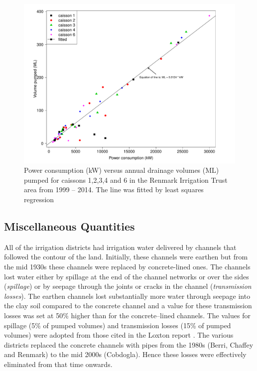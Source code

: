 \documentclass[a4paper, titlepage, 12pt]{article}\usepackage[]{graphicx}\usepackage[]{color}
\newenvironment{knitrout}{}{} %
\begin{document}
\begin{sffamily}
\begin{figure}
\begin{knitrout}
\color{fgcolor}
\includegraphics[width=0.95\linewidth]{../figures/cds-1} 

\end{knitrout}
\caption{Power consumption (kW) versus annual drainage volumes (ML) pumped for caissons 1,2,3,4 and 6 in the Renmark Irrigation Trust area from 1999 -- 2014. The line was fitted by least squares regression}
\label{fig02}
\end{figure}

\subsection{Miscellaneous Quantities}
All of the irrigation districts had irrigation water delivered by channels that followed the contour of the land. Initially, these channels were earthen but from the mid 1930s these channels were replaced by concrete-lined ones. The channels lost water either by spillage at the end of the channel networks or over the sides (\textit{spillage}) or by seepage through the joints or cracks in the channel (\textit{transmission losses}). The earthen channels lost substantially more water through seepage into the clay soil compared to the concrete channel and a value for these transmission losses was set at 50\% higher than for the concrete--lined channels. The values for spillage (5\% of pumped volumes) and transmission losses (15\% of pumped volumes) were adopted from those cited in the Loxton report \citep{Meissner2011a}.  The various districts replaced the concrete channels with pipes from the 1980s (Berri, Chaffey and Renmark) to the mid 2000s (Cobdogla). Hence these losses were effectively eliminated from that time onwards.


\end{sffamily}
\end{document}
